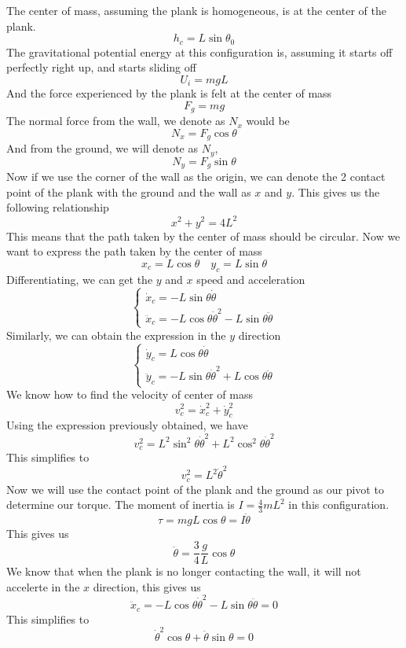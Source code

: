 \documentclass[12pt]{article}
\begin{document}
\begin{itemize}
    The center of mass, assuming the plank is homogeneous, is at the center of the plank.
    \[
    h_c = L\sin\theta_0
    \]
    The gravitational potential energy at this configuration is, assuming it starts off perfectly right up, and starts sliding off
    \[
    U_{i} = mgL
    \]
    And the force experienced by the plank is felt at the center of mass
    \[
    F_g = mg
    \]
    The normal force from the wall, we denote as $N_x$ would be
    \[
    N_x = F_g\cos\theta
    \]
    And from the ground, we will denote as $N_y$,
    \[
    N_y = F_g\sin\theta
    \]
    Now if we use the corner of the wall as the origin, we can denote the 2 contact point of the plank with the ground and the wall as $x$ and $y$. This gives us the following relationship
    \[
    x^2 + y^2 = 4L^2
    \]
    This means that the path taken by the center of mass should be circular. Now we want to express the path taken by the center of mass
    \[
    x_c = L\cos\theta \quad y_c = L\sin\theta
    \]
    Differentiating, we can get the $y$ and $x$ speed and acceleration
    \[
    \begin{cases}
        \dot x_c = -L\sin\theta\dot\theta\\
        \ddot x_c = -L\cos\theta\dot\theta^2 - L\sin\theta\ddot\theta
    \end{cases}
    \]
    Similarly, we can obtain the expression in the $y$ direction
    \[
    \begin{cases}
        \dot y_c = L\cos\theta\dot\theta\\
        \ddot y_c = -L\sin\theta\dot\theta^2 + L\cos\theta\ddot\theta
    \end{cases}
    \]
    We know how to find the velocity of center of mass
    \[
    v_c^2 = \dot x_c^2 + \dot y_c ^2 
    \]
    Using the expression previously obtained, we have
    \[
    v_c^2 = L^2\sin^2\theta\dot\theta^2 + L^2\cos^2\theta\dot\theta^2
    \]
    This simplifies to
    \[
    v_c^2 = L^2\dot\theta^2
    \]
    Now we will use the contact point of the plank and the ground as our pivot to determine our torque. The moment of inertia is $I = \frac{4}{3}mL^2$ in this configuration.
    \[
    \tau = mgL\cos\theta = I\ddot \theta
    \]
    This gives us
    \[
    \ddot\theta = \frac{3}{4}\frac{g}{L}\cos\theta
    \]
    We know that when the plank is no longer contacting the wall, it will not accelerte in the $x$ direction, this gives us
    \[
    \ddot x_c = -L\cos\theta\dot\theta^2 - L\sin\theta\ddot\theta = 0
    \]
    This simplifies to
    \[
    \dot\theta^2\cos\theta + \ddot\theta\sin\theta=0
\]
\end{itemize}
\end{document}
